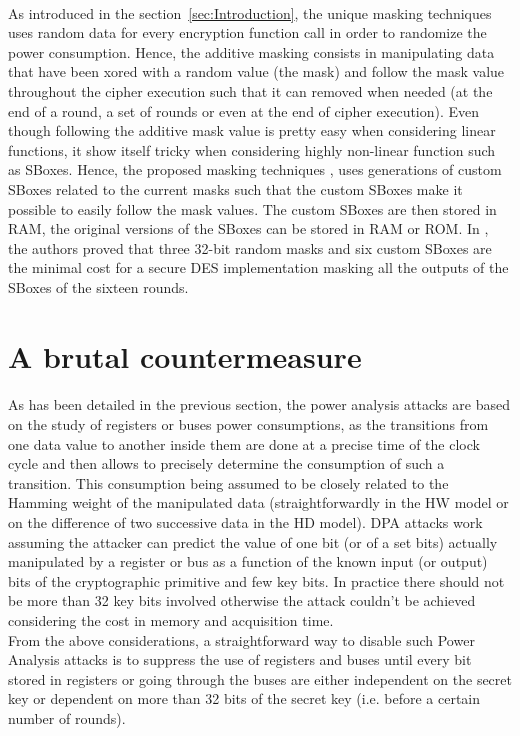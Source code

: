 \documentclass[11pt,a4paper]{article}
\begin{document}
{{{{{{\paragraph{}
As introduced in the section~\ref{sec:Introduction}, the unique masking techniques uses random data for every encryption function call in order to randomize the power consumption. Hence, the
additive masking consists in manipulating data that have been xored with a random value (the mask) and follow the mask value throughout the cipher execution such that it can removed 
when needed (at the end of a round, a set of rounds or even at the end of cipher execution). Even though following the additive mask value is pretty easy when considering linear functions,
it show itself tricky when considering highly non-linear function such as SBoxes. Hence, the proposed masking techniques \cite{AkkarGiraud01, AkkarGoubin03, AkkarBevanGoubin04}, uses generations
of custom SBoxes related to the current masks such that the custom SBoxes make it possible to easily follow the mask values. The custom SBoxes are then stored in RAM, the original versions 
of the SBoxes can be stored in RAM or ROM. In \cite{JiqiangLvYongfei05}, the authors proved that three 32-bit random masks and six custom SBoxes are the minimal
cost for a secure DES implementation masking all the outputs of the SBoxes of the sixteen rounds. 

\section{A brutal countermeasure}      
\label{sec:brutalcontermeasure}
\paragraph{}
As has been detailed in the previous section, the power analysis attacks are based on the study of registers or buses power consumptions, as the transitions from one data value to another inside 
them are done at a precise time of the clock cycle and then allows to precisely determine the consumption of such a transition. This consumption being assumed to be closely related to the 
Hamming weight of the manipulated data (straightforwardly in the HW model or on the difference of two successive data in the HD model). DPA attacks work assuming the attacker can predict 
the value of one bit (or of a set bits) actually manipulated by a register or bus as a function of the known input (or output) bits of the cryptographic primitive and few key bits. In practice 
there should not be more than 32 key bits involved \cite{AkkarGoubin03, AkkarBevanGoubin04, JiqiangLvYongfei05} otherwise the attack couldn't be achieved considering the cost in memory 
and acquisition time.  \\
From the above considerations, a straightforward way to disable such Power Analysis attacks is to suppress the use of registers and buses until every bit stored in registers or going 
through the buses are either independent on the secret key or dependent on more than 32 bits of the secret key (i.e. before a certain number of rounds).
}}}}}}
\end{document}
